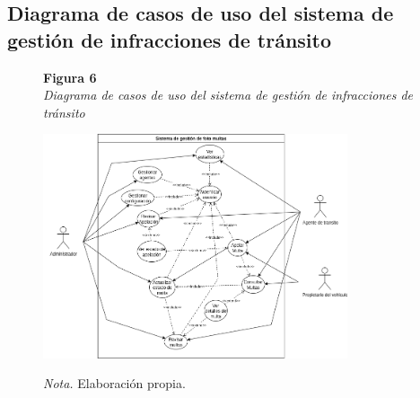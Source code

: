 \subsection{Diagrama de casos de uso del sistema de gestión de infracciones de tránsito }
\begin{figure}[htbp]
    \begin{flushleft}
        \textbf{Figura 6}\\[2em]
        \textit{Diagrama de casos de uso del sistema de gestión de infracciones de tránsito}
    \end{flushleft}
    \vspace{1em}
    \centering
    \includegraphics[width=0.8\textwidth]{Images/CasosUso.png}
    \vspace{2em}
    \begin{flushleft}
        \textit{Nota.} Elaboración propia.
    \end{flushleft}
    \label{fig:casos_uso}
\end{figure}

